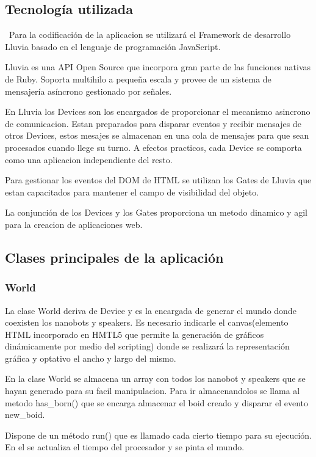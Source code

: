 \subsection{Tecnología utilizada}
\label{sec:tecnologia_utilizada}
\
Para la codificación de la aplicacion se utilizará el Framework de desarrollo Lluvia basado en el lenguaje de programación JavaScript. 

Lluvia es una API Open Source que incorpora gran parte de las funciones nativas de Ruby. Soporta multihilo a pequeña escala y provee de un sistema de mensajería asíncrono gestionado por señales. 

En Lluvia los Devices son los encargados de proporcionar el mecanismo asincrono de comunicacion. Estan preparados para disparar eventos y recibir mensajes de otros Devices, estos mesajes se almacenan en una cola de mensajes para que sean procesados cuando llege su turno. A efectos practicos, cada Device se comporta como una aplicacion independiente del resto.

Para gestionar los eventos del DOM de HTML se utilizan los Gates de Lluvia que estan capacitados para mantener el campo de visibilidad del objeto. 

La conjunción de los Devices y los Gates proporciona un metodo dinamico y agil para la creacion de aplicaciones web. 
\subsection{Clases principales de la aplicación}
\label{sec:clases_principlaes}

\subsubsection{World}
\label{sec:world}
La clase World deriva de Device y es la encargada de generar el mundo donde coexisten los nanobots y speakers. Es necesario indicarle el canvas(elemento HTML incorporado en HMTL5 que permite la generación de gráficos dinámicamente por medio del scripting) donde se realizará la representación gráfica y optativo el ancho y largo del mismo. 

En la clase World se almacena un array con todos los nanobot y speakers que se hayan generado  para su facil manipulacion. Para ir almacenandolos se llama al metodo has\_born() que se encarga almacenar el boid creado y disparar el evento new\_boid.

Dispone de un método run() que es llamado cada cierto tiempo para su ejecución. En el  se actualiza el tiempo del procesador y se pinta el mundo.

